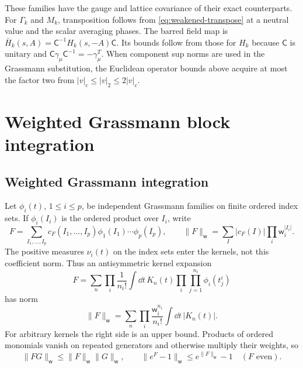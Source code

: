 These families have the gauge and lattice covariance of their exact
counterparts. For $\Gamma_k$ and $M_k$, transposition follows from
\eqref{eq:weakened-transpose} at a neutral value and the scalar
averaging phases. The barred field map is
$\bar H_k(s,A)=\mathsf C^{-1}H_k(s,-A)\mathsf C$.
Its bounds follow from those for $H_k$ because $\mathsf C$ is unitary
and $\mathsf C\gamma_\mu\mathsf C^{-1}=-\gamma_\mu^T$.
When component sup norms are used in the Grassmann substitution,
the Euclidean operator bounds above acquire at most the factor two
from $|v|_c\le|v|_2\le2|v|_c$.

\section{Weighted Grassmann block integration}\label{sec:weighted-integration}

\subsection{Weighted Grassmann integration}\label{subsec:weighted-grassmann}

Let $\phi_i(t)$, $1\le i\le p$, be independent Grassmann families
on finite ordered index sets. If $\phi_i(I_i)$ is the ordered product
over $I_i$, write
\[
 F=\sum_{I_1,\ldots,I_p}c_F(I_1,\ldots,I_p)
                 \phi_1(I_1)\cdots\phi_p(I_p),\qquad
 \|F\|_{\mathsf w}=\sum_I|c_F(I)|\prod_i\mathsf w_i^{|I_i|}.
\]
The positive measures $\nu_i(t)$ on the index sets enter the kernels,
not this coefficient norm. Thus an antisymmetric kernel expansion
\[
 F=\sum_n\prod_i\frac1{n_i!}\int\dd t\,K_n(t)
                       \prod_i\prod_{j=1}^{n_i}\phi_i(t_j^i)
\]
has norm
\begin{equation}\label{eq:grassmann-kernel-norm}
 \|F\|_{\mathsf w}
     =\sum_n\prod_i\frac{\mathsf w_i^{n_i}}{n_i!}
                      \int\dd t\,|K_n(t)|.
\end{equation}
For arbitrary kernels the right side is an upper bound. Products of
ordered monomials vanish on repeated generators and otherwise multiply
their weights, so
\begin{equation}\label{eq:grassmann-product-bound}
 \|FG\|_{\mathsf w}\le\|F\|_{\mathsf w}\|G\|_{\mathsf w},
 \qquad \|e^F-1\|_{\mathsf w}\le e^{\|F\|_{\mathsf w}}-1
       \quad(F\text{ even}).
\end{equation}

